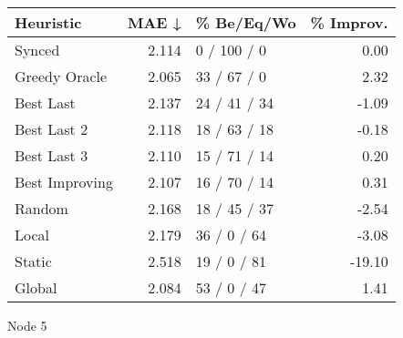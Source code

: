 \begin{tabular}{lrlr}
\toprule
\textbf{Heuristic} & \textbf{MAE ↓} & \textbf{\% Be/Eq/Wo} & \textbf{\% Improv.} \\
\midrule
            Synced &          2.114 &          0 / 100 / 0 &                0.00 \\
     Greedy Oracle &          2.065 &          33 / 67 / 0 &                2.32 \\
         Best Last &          2.137 &         24 / 41 / 34 &               -1.09 \\
       Best Last 2 &          2.118 &         18 / 63 / 18 &               -0.18 \\
       Best Last 3 &          2.110 &         15 / 71 / 14 &                0.20 \\
    Best Improving &          2.107 &         16 / 70 / 14 &                0.31 \\
            Random &          2.168 &         18 / 45 / 37 &               -2.54 \\
             Local &          2.179 &          36 / 0 / 64 &               -3.08 \\
            Static &          2.518 &          19 / 0 / 81 &              -19.10 \\
            Global &          2.084 &          53 / 0 / 47 &                1.41 \\
\bottomrule
\end{tabular}
\caption{Node 5}
\label{tab:hr_non_lr05_le1_bs4_5}
